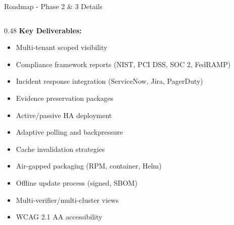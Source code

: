 \begin{frame}{Roadmap - Phase 2 \& 3 Details}
\begin{columns}[T]
\begin{column}{0.48\textwidth}
      \textbf{Key Deliverables:}
      \begin{itemize}
        \setlength{\itemsep}{0pt}
        \item Multi-tenant scoped visibility
        \item Compliance framework reports (NIST, PCI DSS, SOC 2, FedRAMP)
        \item Incident response integration (ServiceNow, Jira, PagerDuty)
        \item Evidence preservation packages
        \item Active/passive HA deployment
        \item Adaptive polling and backpressure
        \item Cache invalidation strategies
        \item Air-gapped packaging (RPM, container, Helm)
        \item Offline update process (signed, SBOM)
        \item Multi-verifier/multi-cluster views
        \item WCAG 2.1 AA accessibility
      \end{itemize}
    \end{column}
  \end{columns}
\end{frame}
